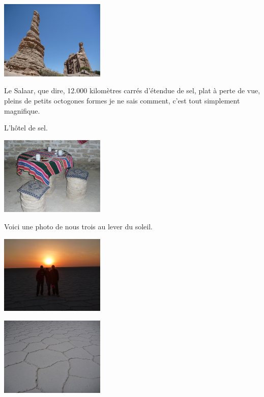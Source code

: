\begin{multicols}{2}
\smallbreak
\hspace*{-0.65cm}
\includegraphics[width=5cm]{articles/La-paz-humahuaca-et-salaar/1257387285NQRd.jpg}
\smallbreak

Le Salaar, que dire, 12.000 kilomètres carrés d'étendue de sel, plat à perte de vue, pleins de petits octogones formes je ne sais comment, c'est tout simplement magnifique.

L'hôtel de sel.

\smallbreak
\hspace*{-0.65cm}
\includegraphics[width=5cm]{articles/La-paz-humahuaca-et-salaar/12573872732dVv.jpg}
\smallbreak

Voici une photo de nous trois au lever du soleil.

\smallbreak
\hspace*{-0.65cm}
\includegraphics[width=5cm]{articles/La-paz-humahuaca-et-salaar/1257203731jBS0.jpg}
\smallbreak

\smallbreak
\hspace*{-0.65cm}
\includegraphics[width=5cm]{articles/La-paz-humahuaca-et-salaar/1257389754e5dq.jpg}
\smallbreak


\end{multicols}
